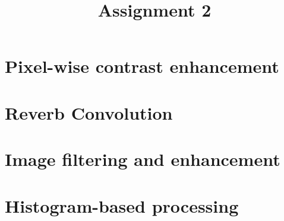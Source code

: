 \documentclass[12pt]{article}
\title{Assignment 2}
\begin{document}
\maketitle

\section{Pixel-wise contrast enhancement}

\section{Reverb Convolution}

\section{Image filtering and enhancement}

\section{Histogram-based processing}
\end{document}
